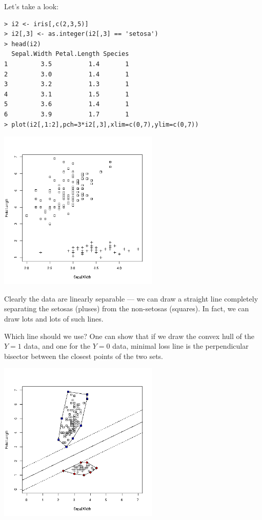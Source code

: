 Let's take a look:

\begin{lstlisting}
> i2 <- iris[,c(2,3,5)]
> i2[,3] <- as.integer(i2[,3] == 'setosa')
> head(i2)
  Sepal.Width Petal.Length Species
1         3.5          1.4       1
2         3.0          1.4       1
3         3.2          1.3       1
4         3.1          1.5       1
5         3.6          1.4       1
6         3.9          1.7       1
> plot(i2[,1:2],pch=3*i2[,3],xlim=c(0,7),ylim=c(0,7))
\end{lstlisting}

\includegraphics[width=3in]{IrisOrigNew.png}

Clearly the data are linearly separable --- we can draw a straight line
completely separating the setosas (pluses) from the non-setosas
(squares).  In fact, we can draw lots and lots of such lines.

Which line should we use?  One can show that if we draw the convex hull
of the $Y = 1$ data, and one for the $Y = 0$ data, minimal loss line is
the perpendicular bisector between the closest points of the two sets.

\includegraphics[width=3in]{IrisConvNew.png}

